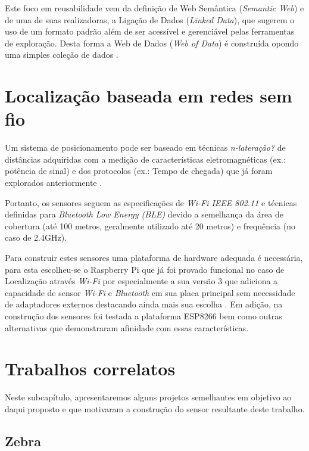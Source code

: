 Este foco em reusabilidade vem da definição de Web Semântica (\emph{Semantic
Web}) e de uma de suas realizadoras, a Ligação de Dados (\emph{Linked Data}),
que sugerem o uso de um formato padrão além de ser acessível e gerenciável pelas
ferramentas de exploração. Desta forma a Web de Dados (\emph{Web of Data}) é
construída opondo uma simples coleção de dados \cite{Bizer2009}.

\section{Localização baseada em redes sem fio}
\label{sec:Localização baseada em redes sem fio}

Um sistema de posicionamento pode ser baseado em técnicas
\emph{n-lateração?} de distâncias adquiridas com a medição de características
eletromagnéticas (ex.: potência de sinal) e dos protocolos (ex.: Tempo de
chegada) que já foram explorados anteriormente \cite{Abusubaih2007,
bahillo2009ieee, Feldmann2003}.

Portanto, os sensores seguem as especificações de \emph{Wi-Fi IEEE 802.11}
\cite{Crow1997} e técnicas definidas para \emph{Bluetooth Low Energy (BLE)}
\cite{Hossain2007} devido a semelhança da área de cobertura (até 100 metros,
geralmente utilizado até 20 metros) e frequência (no caso de 2.4GHz).

Para construir estes sensores uma plataforma de hardware adequada é necessária,
para esta escolheu-se o Raspberry Pi \cite{Vujovic2014, Vujovic2015} que já
foi provado funcional no caso de Localização através \emph{Wi-Fi} por
 especialmente a sua versão 3 que adiciona a capacidade
de sensor \emph{Wi-Fi} e \emph{Bluetooth} em sua placa principal sem
necessidade de adaptadores externos destacando ainda mais sua escolha
\cite{RPI2016}. Em adição, na construção dos sensores foi testada a plataforma ESP8266 bem como
outras alternativas que demonstraram afinidade com essas características.


\section{Trabalhos correlatos}
\label{Trabalhos correlatos}
Neste subcapítulo, apresentaremos alguns projetos semelhantes em objetivo ao daqui
proposto e que motivaram a construção do sensor resultante deste trabalho.

\subsection{Zebra}
\label{subsec:Zebra}

